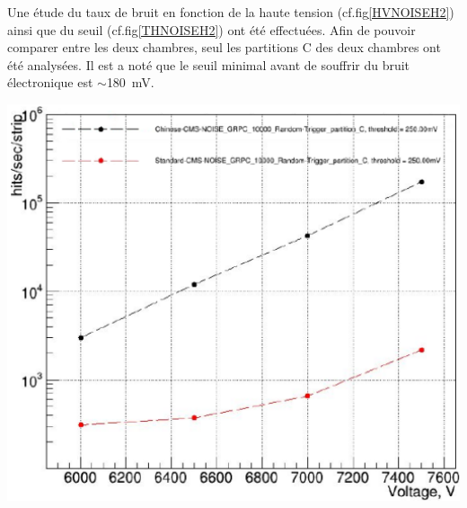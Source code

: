 Une étude du taux de bruit en fonction de la haute tension (cf.fig\ref{HVNOISEH2}) ainsi que du seuil (cf.fig\ref{THNOISEH2}) ont été effectuées. Afin de pouvoir comparer entre les deux chambres, seul les partitions C des deux chambres ont été analysées.
Il est a noté que le seuil minimal avant de souffrir du bruit électronique est $\sim$\SI{180}{\milli\volt}.

\noindent
\begin{minipage}[th!]{.48\textwidth}
	\noindent
	\centering
	\includegraphics[width=1\textwidth]{GLA/HVNOISEH2.png}
	\label{HVNOISEH2}
\end{minipage}%
\hfill
